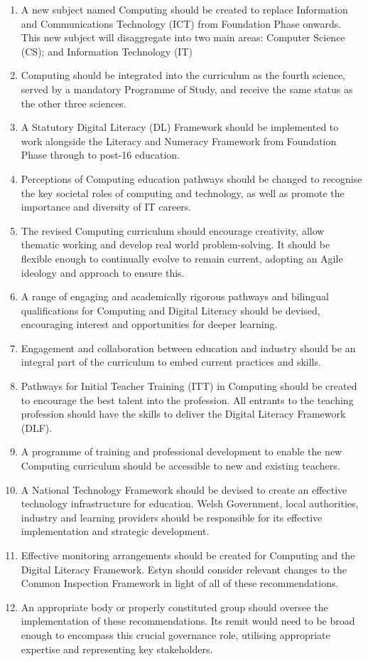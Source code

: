 \begin{enumerate}
\item A new subject named Computing should be created to replace
  Information and Communications Technology (ICT) from Foundation
  Phase onwards. This new subject will disaggregate into two main
  areas: Computer Science (CS); and Information Technology (IT)
\item Computing should be integrated into the curriculum as the fourth
  science, served by a mandatory Programme of Study, and receive the
  same status as the other three sciences.
\item A Statutory Digital Literacy (DL) Framework should be
  implemented to work alongside the Literacy and Numeracy Framework
  from Foundation Phase through to post-16 education.
\item Perceptions of Computing education pathways should be changed to
  recognise the key societal roles of computing and technology, as
  well as promote the importance and diversity of IT careers.
\item The revised Computing curriculum should encourage creativity,
  allow thematic working and develop real world problem-solving. It
  should be flexible enough to continually evolve to remain current,
  adopting an Agile ideology and approach to ensure this.
\item A range of engaging and academically rigorous pathways and
  bilingual qualifications for Computing and Digital Literacy should
  be devised, encouraging interest and opportunities for deeper
  learning.
\item Engagement and collaboration between education and industry
  should be an integral part of the curriculum to embed current
  practices and skills.
\item Pathways for Initial Teacher Training (ITT) in Computing should
  be created to encourage the best talent into the profession. All
  entrants to the teaching profession should have the skills to
  deliver the Digital Literacy Framework (DLF).
\item A programme of training and professional development to enable
  the new Computing curriculum should be accessible to new and
  existing teachers.
\item A National Technology Framework should be devised to create an
  effective technology infrastructure for education. Welsh Government,
  local authorities, industry and learning providers should be
  responsible for its effective implementation and strategic
  development.
\item Effective monitoring arrangements should be created for
  Computing and the Digital Literacy Framework. Estyn should consider
  relevant changes to the Common Inspection Framework in light of all
  of these recommendations.
\item An appropriate body or properly constituted group should oversee
  the implementation of these recommendations. Its remit would need to
  be broad enough to encompass this crucial governance role, utilising
  appropriate expertise and representing key stakeholders.
\end{enumerate}

